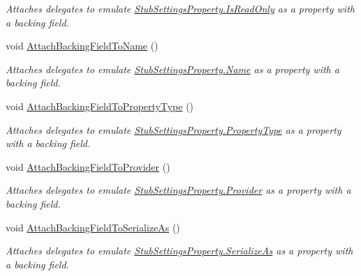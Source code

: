 \begin{DoxyCompactItemize}
\begin{DoxyCompactList}\small\item\em Attaches delegates to emulate \hyperlink{class_system_1_1_configuration_1_1_fakes_1_1_stub_settings_property_a95fdf2722728c350f8582b316c0b0161}{Stub\-Settings\-Property.\-Is\-Read\-Only} as a property with a backing field.\end{DoxyCompactList}\item 
void \hyperlink{class_system_1_1_configuration_1_1_fakes_1_1_stub_settings_property_acf0b81f8e639fefd50d60d2c489cece4}{Attach\-Backing\-Field\-To\-Name} ()
\begin{DoxyCompactList}\small\item\em Attaches delegates to emulate \hyperlink{class_system_1_1_configuration_1_1_fakes_1_1_stub_settings_property_a31dcb26e3a77e3537f321e53690045b1}{Stub\-Settings\-Property.\-Name} as a property with a backing field.\end{DoxyCompactList}\item 
void \hyperlink{class_system_1_1_configuration_1_1_fakes_1_1_stub_settings_property_ad39864b3ff42e443c99c55c7dde817df}{Attach\-Backing\-Field\-To\-Property\-Type} ()
\begin{DoxyCompactList}\small\item\em Attaches delegates to emulate \hyperlink{class_system_1_1_configuration_1_1_fakes_1_1_stub_settings_property_a2dcf6ac75e302d26af20ab3c70441a97}{Stub\-Settings\-Property.\-Property\-Type} as a property with a backing field.\end{DoxyCompactList}\item 
void \hyperlink{class_system_1_1_configuration_1_1_fakes_1_1_stub_settings_property_a721535f7ddf6aba084b0c50b75ee8fab}{Attach\-Backing\-Field\-To\-Provider} ()
\begin{DoxyCompactList}\small\item\em Attaches delegates to emulate \hyperlink{class_system_1_1_configuration_1_1_fakes_1_1_stub_settings_property_ae0e9b081c1d641c684b713777a8d3970}{Stub\-Settings\-Property.\-Provider} as a property with a backing field.\end{DoxyCompactList}\item 
void \hyperlink{class_system_1_1_configuration_1_1_fakes_1_1_stub_settings_property_a66d88c14b35069f43c641baba7a6360f}{Attach\-Backing\-Field\-To\-Serialize\-As} ()
\begin{DoxyCompactList}\small\item\em Attaches delegates to emulate \hyperlink{class_system_1_1_configuration_1_1_fakes_1_1_stub_settings_property_a0ad233811003228dbbef64e61ed5fa25}{Stub\-Settings\-Property.\-Serialize\-As} as a property with a backing field.\end{DoxyCompactList}\end{DoxyCompactItemize}
